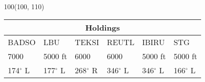 \documentclass[10pt,landscape,a4paper]{article}
\begin{document}
\begin{textblock}{100}(100, 110)
\begin{table}[]
\begin{tabular}{|l|l|l|l|l|l|}
\multicolumn{6}{c}{\textbf{Holdings}} \\ \hline
BADSO & LBU & TEKSI & REUTL & IBIRU & STG \\ \hline
7000 & 5000 ft & 6000 & 6000 & 5000 ft & 5000 ft \\
174$^\circ$ L & 177$^\circ$ L & 268$^\circ$ R & 346$^\circ$ L & 346$^\circ$ L & 166$^\circ$ L \\ \hline
\end{tabular}
\end{table}
\end{textblock}
\end{document}
